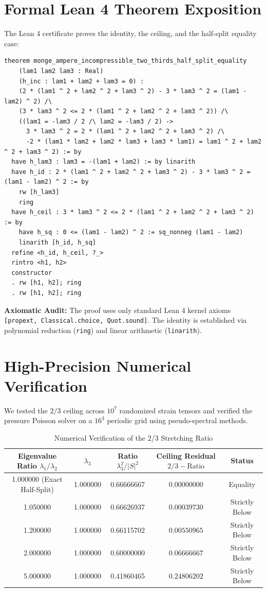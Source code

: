 \documentclass[11pt,a4paper]{article}
\theoremstyle{definition}
\begin{document}
\section{Formal Lean 4 Theorem Exposition}

The Lean 4 certificate proves the identity, the ceiling, and the half-split equality case:

\begin{lstlisting}[language=Lean4]
theorem monge_ampere_incompressible_two_thirds_half_split_equality
    (lam1 lam2 lam3 : Real)
    (h_inc : lam1 + lam2 + lam3 = 0) :
    (2 * (lam1 ^ 2 + lam2 ^ 2 + lam3 ^ 2) - 3 * lam3 ^ 2 = (lam1 - lam2) ^ 2) /\
    (3 * lam3 ^ 2 <= 2 * (lam1 ^ 2 + lam2 ^ 2 + lam3 ^ 2)) /\
    ((lam1 = -lam3 / 2 /\ lam2 = -lam3 / 2) ->
      3 * lam3 ^ 2 = 2 * (lam1 ^ 2 + lam2 ^ 2 + lam3 ^ 2) /\
      -2 * (lam1 * lam2 + lam2 * lam3 + lam3 * lam1) = lam1 ^ 2 + lam2 ^ 2 + lam3 ^ 2) := by
  have h_lam3 : lam3 = -(lam1 + lam2) := by linarith
  have h_id : 2 * (lam1 ^ 2 + lam2 ^ 2 + lam3 ^ 2) - 3 * lam3 ^ 2 = (lam1 - lam2) ^ 2 := by
    rw [h_lam3]
    ring
  have h_ceil : 3 * lam3 ^ 2 <= 2 * (lam1 ^ 2 + lam2 ^ 2 + lam3 ^ 2) := by
    have h_sq : 0 <= (lam1 - lam2) ^ 2 := sq_nonneg (lam1 - lam2)
    linarith [h_id, h_sq]
  refine <h_id, h_ceil, ?_>
  rintro <h1, h2>
  constructor
  . rw [h1, h2]; ring
  . rw [h1, h2]; ring
\end{lstlisting}

\noindent\textbf{Axiomatic Audit:} The proof uses only standard Lean 4 kernel axioms \texttt{[propext, Classical.choice, Quot.sound]}. The identity is established via polynomial reduction (\texttt{ring}) and linear arithmetic (\texttt{linarith}).


\section{High-Precision Numerical Verification}

We tested the $2/3$ ceiling across $10^7$ randomized strain tensors and verified the pressure Poisson solver on a $16^3$ periodic grid using pseudo-spectral methods.

\begin{table}[htbp]
\centering
\caption{Numerical Verification of the 2/3 Stretching Ratio}
\begin{tabular}{ccccc}
\toprule
Eigenvalue Ratio $\lambda_1 / \lambda_2$ & $\lambda_3$ & Ratio $\lambda_3^2 / |S|^2$ & Ceiling Residual $2/3 - \text{Ratio}$ & Status \\
\midrule
1.000000 (Exact Half-Split) & 1.000000 & 0.66666667 & $0.00000000$ & Equality \\
1.050000 & 1.000000 & 0.66626937 & $0.00039730$ & Strictly Below \\
1.200000 & 1.000000 & 0.66115702 & $0.00550965$ & Strictly Below \\
2.000000 & 1.000000 & 0.60000000 & $0.06666667$ & Strictly Below \\
5.000000 & 1.000000 & 0.41860465 & $0.24806202$ & Strictly Below \\
\bottomrule
\end{tabular}
\end{table}
\end{document}
